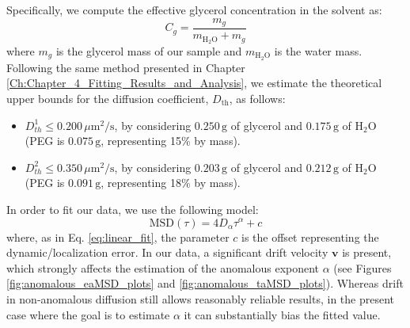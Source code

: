 Specifically, we compute the effective glycerol concentration in the solvent as: $$C_g = \frac{m_g}{m_{\mathrm{H_2O}} + m_g}$$
where $m_g$ is the glycerol mass of our sample and $m_{\mathrm{H_2O}}$ is the water mass. Following the same method presented in Chapter \ref{Ch:Chapter_4_Fitting_Results_and_Analysis}, we estimate the theoretical upper bounds for the diffusion coefficient, $D_{\mathrm{th}}$, as follows:
\begin{itemize}
    \item $D_{th}^1 \leq 0.200\,\mu\mathrm{m}^2/\mathrm{s}$, by considering $0.250\,\mathrm{g}$ of glycerol and $0.175\,\mathrm{g}$ of $\mathrm{H_2O}$ (PEG is $0.075\,\mathrm{g}$, representing 15\% by mass).
    \item $D_{th}^2 \leq 0.350\,\mu\mathrm{m}^2/\mathrm{s}$, by considering $0.203\,\mathrm{g}$ of glycerol and $0.212\,\mathrm{g}$ of $\mathrm{H_2O}$ (PEG is $0.091\,\mathrm{g}$, representing 18\% by mass).
\end{itemize}

In order to fit our data, we use the following model:
\begin{equation}\label{eq:anomalous_equation_drift}
    \mathrm{MSD}(\tau) = 4D_{\alpha}\tau^{\alpha} + c
\end{equation}
where, as in Eq. \ref{eq:linear_fit}, the parameter $c$ is the offset representing the dynamic/localization error.
In our data, a significant drift velocity $\mathbf{v}$ is present, which strongly affects the estimation of the anomalous exponent $\alpha$ (see Figures \ref{fig:anomalous_eaMSD_plots} and \ref{fig:anomalous_taMSD_plots}).
Whereas drift in non-anomalous diffusion still allows reasonably reliable results, in the present case where the goal is to estimate $\alpha$ it can substantially bias the fitted value.


